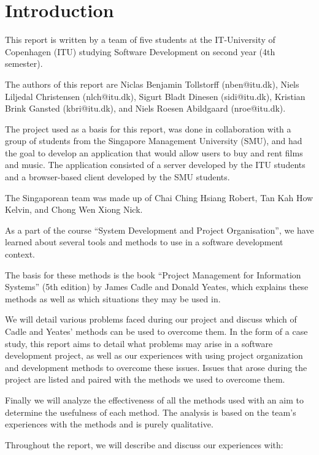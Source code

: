 \section{Introduction}

This report is written by a team of five students at the IT-University of Copenhagen (ITU)
studying Software Development on second year (4th semester).

The authors of this report are Niclas Benjamin Tollstorff (nben@itu.dk), Niels Liljedal
Christensen (nlch@itu.dk), Sigurt Bladt Dinesen (sidi@itu.dk), Kristian Brink Gansted
(kbri@itu.dk), and Niels Roesen Abildgaard (nroe@itu.dk).

The project used as a basis for this report, was done in collaboration with a group of
students from the Singapore Management University (SMU), and had the goal to develop an
application that would allow users to buy and rent films and music. The application consisted
of a server developed by the ITU students and a browser-based client developed by the SMU
students.

The Singaporean team was made up of Chai Ching Hsiang Robert, Tan Kah How Kelvin, and
Chong Wen Xiong Nick.

As a part of the course “System Development and Project Organisation”, we have learned
about several tools and methods to use in a software development context.

The basis for these methods is the book “Project Management for Information Systems”
(5th edition) by James Cadle and Donald Yeates, which explains these methods as well
as which situations they may be used in.

We will detail various problems faced during our project and discuss which of Cadle and
Yeates' methods can be used to overcome them. In the form of a case study, this report
aims to detail what problems may arise in a software development project, as well as our
experiences with using project organization and development methods to overcome these
issues. Issues that arose during the project are listed and paired with the methods we
used to overcome them.

Finally we will analyze the effectiveness of all the methods used with an aim to determine
the usefulness of each method. The analysis is based on the team’s experiences with the
methods and is purely qualitative.

Throughout the report, we will describe and discuss our experiences with:


